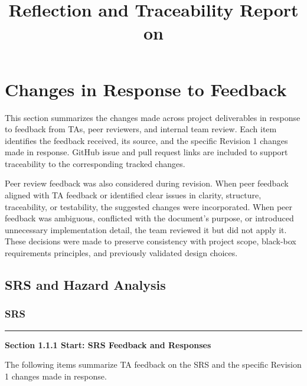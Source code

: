 \documentclass{article}
\title{Reflection and Traceability Report on \progname}
\author{\authname}
\date{}
\begin{document}
\maketitle

\section{Changes in Response to Feedback}

This section summarizes the changes made across project deliverables in
response to feedback from TAs, peer reviewers, and internal team review.
Each item identifies the feedback received, its source, and the specific
Revision 1 changes made in response. GitHub issue and pull request links
are included to support traceability to the corresponding tracked changes.

Peer review feedback was also considered during revision. When peer
feedback aligned with TA feedback or identified clear issues in clarity,
structure, traceability, or testability, the suggested changes were
incorporated. When peer feedback was ambiguous, conflicted with the
document's purpose, or introduced unnecessary implementation detail,
the team reviewed it but did not apply it. These decisions were made to
preserve consistency with project scope, black-box requirements
principles, and previously validated design choices.

\subsection{SRS and Hazard Analysis}

\subsubsection{SRS}

\noindent\rule{\textwidth}{0.6pt}

\noindent\textbf{Section 1.1.1 Start: SRS Feedback and Responses}

\noindent
The following items summarize TA feedback on the SRS and the specific
Revision 1 changes made in response.
\end{document}
